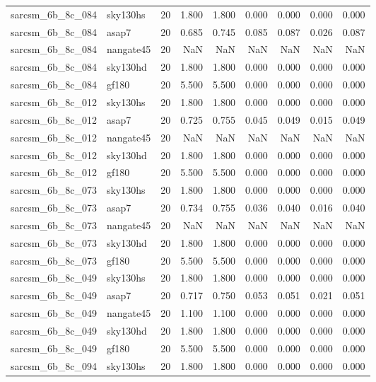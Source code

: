 \begin{tabular}{llrrrrrrr}
sarcsm\_6b\_8c\_084 & sky130hs & 20 & 1.800 & 1.800 & 0.000 & 0.000 & 0.000 & 0.000 \\
sarcsm\_6b\_8c\_084 & asap7 & 20 & 0.685 & 0.745 & 0.085 & 0.087 & 0.026 & 0.087 \\
sarcsm\_6b\_8c\_084 & nangate45 & 20 & NaN & NaN & NaN & NaN & NaN & NaN \\
sarcsm\_6b\_8c\_084 & sky130hd & 20 & 1.800 & 1.800 & 0.000 & 0.000 & 0.000 & 0.000 \\
sarcsm\_6b\_8c\_084 & gf180 & 20 & 5.500 & 5.500 & 0.000 & 0.000 & 0.000 & 0.000 \\
sarcsm\_6b\_8c\_012 & sky130hs & 20 & 1.800 & 1.800 & 0.000 & 0.000 & 0.000 & 0.000 \\
sarcsm\_6b\_8c\_012 & asap7 & 20 & 0.725 & 0.755 & 0.045 & 0.049 & 0.015 & 0.049 \\
sarcsm\_6b\_8c\_012 & nangate45 & 20 & NaN & NaN & NaN & NaN & NaN & NaN \\
sarcsm\_6b\_8c\_012 & sky130hd & 20 & 1.800 & 1.800 & 0.000 & 0.000 & 0.000 & 0.000 \\
sarcsm\_6b\_8c\_012 & gf180 & 20 & 5.500 & 5.500 & 0.000 & 0.000 & 0.000 & 0.000 \\
sarcsm\_6b\_8c\_073 & sky130hs & 20 & 1.800 & 1.800 & 0.000 & 0.000 & 0.000 & 0.000 \\
sarcsm\_6b\_8c\_073 & asap7 & 20 & 0.734 & 0.755 & 0.036 & 0.040 & 0.016 & 0.040 \\
sarcsm\_6b\_8c\_073 & nangate45 & 20 & NaN & NaN & NaN & NaN & NaN & NaN \\
sarcsm\_6b\_8c\_073 & sky130hd & 20 & 1.800 & 1.800 & 0.000 & 0.000 & 0.000 & 0.000 \\
sarcsm\_6b\_8c\_073 & gf180 & 20 & 5.500 & 5.500 & 0.000 & 0.000 & 0.000 & 0.000 \\
sarcsm\_6b\_8c\_049 & sky130hs & 20 & 1.800 & 1.800 & 0.000 & 0.000 & 0.000 & 0.000 \\
sarcsm\_6b\_8c\_049 & asap7 & 20 & 0.717 & 0.750 & 0.053 & 0.051 & 0.021 & 0.051 \\
sarcsm\_6b\_8c\_049 & nangate45 & 20 & 1.100 & 1.100 & 0.000 & 0.000 & 0.000 & 0.000 \\
sarcsm\_6b\_8c\_049 & sky130hd & 20 & 1.800 & 1.800 & 0.000 & 0.000 & 0.000 & 0.000 \\
sarcsm\_6b\_8c\_049 & gf180 & 20 & 5.500 & 5.500 & 0.000 & 0.000 & 0.000 & 0.000 \\
sarcsm\_6b\_8c\_094 & sky130hs & 20 & 1.800 & 1.800 & 0.000 & 0.000 & 0.000 & 0.000 \\

\end{tabular}
